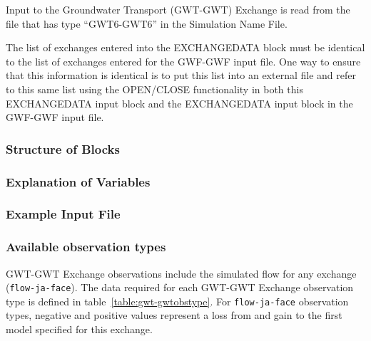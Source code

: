 Input to the Groundwater Transport (GWT-GWT) Exchange is read from the file that has type ``GWT6-GWT6'' in the Simulation Name File.

The list of exchanges entered into the EXCHANGEDATA block must be identical to the list of exchanges entered for the GWF-GWF input file.  One way to ensure that this information is identical is to put this list into an external file and refer to this same list using the OPEN/CLOSE functionality in both this EXCHANGEDATA input block and the EXCHANGEDATA input block in the GWF-GWF input file.

\vspace{5mm}
\subsubsection{Structure of Blocks}




\vspace{5mm}
\subsubsection{Explanation of Variables}
\begin{description}

\end{description}

\vspace{5mm}
\subsubsection{Example Input File}


\vspace{5mm}
\subsubsection{Available observation types}
GWT-GWT Exchange observations include the simulated flow for any exchange (\texttt{flow-ja-face}). The data required for each GWT-GWT Exchange observation type is defined in table~\ref{table:gwt-gwtobstype}. For \texttt{flow-ja-face} observation types, negative and positive values represent a loss from and gain to the first model specified for this exchange.

